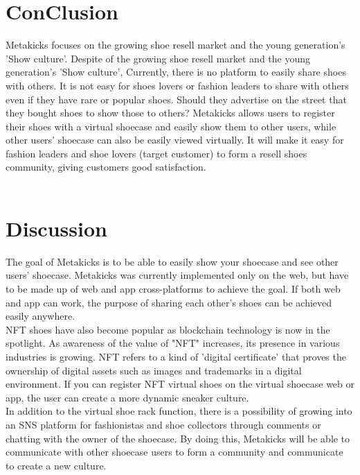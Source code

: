 \documentclass[conference]{IEEEtran}
\begin{document}
\section{ConClusion}
Metakicks focuses on the growing shoe resell market and the young generation's 'Show culture'. Despite of  the growing shoe resell market and the young generation's 'Show culture', Currently, there is no platform to easily share shoes with others. It is not easy for shoes lovers or fashion leaders to share with others even if they have rare or popular shoes. Should they advertise on the street that they bought shoes to show those to others? Metakicks allows users to register their shoes with a virtual shoecase and easily show them to other users, while other users' shoecase can also be easily viewed virtually. It will make it easy for fashion leaders and shoe lovers (target customer) to form a resell shoes community, giving customers good satisfaction.\\\\
\section{Discussion}
The goal of Metakicks is to be able to easily show your shoecase and see other users' shoecase. Metakicks was currently implemented only on the web, but have to be made up of web and app cross-platforms to achieve the goal. If both web and app can work, the purpose of sharing each other's shoes can be achieved easily anywhere. \\ NFT shoes have also become popular as blockchain technology is now in the spotlight. As awareness of the value of "NFT" increases, its presence in various industries is growing. NFT refers to a kind of 'digital certificate' that proves the ownership of digital assets such as images and trademarks in a digital environment. If you can register NFT virtual shoes on the virtual shoecase web or app, the user can create a more dynamic sneaker culture. \\In addition to the virtual shoe rack function, there is a possibility of growing into an SNS platform for fashionistas and shoe collectors through comments or chatting with the owner of the shoecase. By doing this, Metakicks will be able to communicate with other shoecase users to form a community and communicate to create a new culture.
\end{document}
